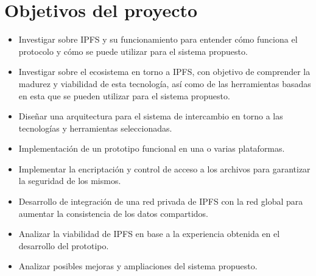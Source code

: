 \section{Objetivos del proyecto}
\begin{itemize}

      \item Investigar sobre IPFS y su funcionamiento para entender cómo funciona el protocolo
            y cómo se puede utilizar para el sistema propuesto.
      \item Investigar sobre el ecosistema en torno a IPFS, con objetivo de comprender
            la madurez y viabilidad de esta tecnología, así como de las herramientas basadas en esta
            que se pueden utilizar para el sistema propuesto.
      \item Diseñar una arquitectura para el sistema de intercambio en torno a las tecnologías y herramientas seleccionadas.
      \item Implementación de un prototipo funcional en una o varias plataformas.
      \item Implementar la encriptación y control de acceso a los archivos para garantizar la
            seguridad de los mismos.
      \item Desarrollo de integración de una red privada de IPFS con la red global para
            aumentar la consistencia de los datos compartidos.
      \item Analizar la viabilidad de IPFS en base a la experiencia obtenida en el desarrollo
            del prototipo.
      \item Analizar posibles mejoras y ampliaciones del sistema propuesto.

\end{itemize}

